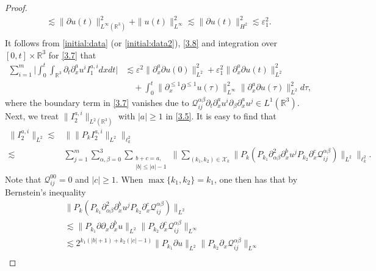 \documentclass[11pt,twoside]{article}
\def\cQ{\mathcal Q}
\def\p{\partial}
\def\ve{\varepsilon}
\def\ls{\lesssim}
\theoremstyle{plain}
\theoremstyle{definition}
\numberwithin{equation}{section}
\begin{document}
\begin{proof}
\begin{equation}
\begin{aligned}
			\ls
			\|\partial u(t)\|_{L^\infty(\mathbb{R}^3)}^2 +\|u(t)\|_{L^\infty}^2
			\ls
			\|\partial u(t)\|_{H^2}^2
			\ls \ve_1^2.\\
		\end{aligned}
	\end{equation}
	It follows from \eqref{initial:data} (or \eqref{initial:data2}), \eqref{3.8} and integration over $[0,t] \times \mathbb{R}^3$
for \eqref{3.7} that
	\begin{equation*}
		\begin{aligned}
		\sum_{i=1}^{m}\big| \int_0^t \int_{\mathbb{R}^3} \partial_t \partial_x^a u^i I_1^{a,i} dx dt\big|
        &\lesssim \ve^2\|\partial_x^a\partial  u(0)\|_{L^2}^2 + \ve^2_1\|\partial_x^a\partial  u(t)\|_{L^2}^2 \\
		&\quad + \int_0^t  \|\partial_x^{\le 1}\partial^{\le 1}  u(\tau)\|_{L^\infty}^2 \|\partial_x^a\partial  u(\tau)\|_{L^2}^2 d\tau,
		\end{aligned}	
	\end{equation*}
	where the boundary term in \eqref{3.7} vanishes due to $\cQ^{\alpha\beta}_{ij}\partial_t \partial_x^a u^i \partial_\beta \partial_x^a u^j  \in L^1(\mathbb{R}^3)$.\\
	Next, we treat $\|I_2^{a,i}\|_{L^2(\mathbb{R}^3)}$ with $|a| \geq 1$ in \eqref{3.5}.
It is easy to find that
	\begin{equation*}
		\begin{aligned}
			\|I_2^{a,i}\|_{L^2}
			\lesssim& \big\| \|P_k I_2^{a,i}\|_{L^2}\big\|_{\ell_k^2} \\
			\lesssim& \sum_{j=1}^m\sum_{\alpha,\beta=0}^3\sum_{\substack{b+c=a, \\ |b| \leq |a|-1}} \big\| \sum_{(k_1,k_2) \in \mathcal{X}_k} \| P_k(P_{k_1} \partial_{\alpha\beta}^2 \partial_x^b u^j P_{k_2} \p_x^c\cQ^{\alpha\beta}_{ij} )\|_{L^2} \big\|_{\ell_k^2}.
		\end{aligned}
	\end{equation*}
Note that $\mathcal{Q}^{00}_{ij}=0$ and $|c|\ge 1$. When $\max\{k_1, k_2\} = k_1$, one then has that by Bernstein's inequality
	\begin{equation*}
		\begin{aligned}
			&\|P_k(P_{k_1} \partial_{\alpha\beta}^2 \partial_x^b u^j P_{k_2} \p_x^c\cQ^{\alpha\beta}_{ij} )\|_{L^2}\\
			&\lesssim \|P_{k_1} \partial\partial_x \partial_x^b u\|_{L^2} \|P_{k_2} \p_x^c\cQ^{\alpha\beta}_{ij} \|_{L^\infty} \\
			&\lesssim 2^{k_1(|b|+1)+k_2(|c|-1)} \|P_{k_1} \partial u\|_{L^2} \|P_{k_2}\p_x \cQ^{\alpha\beta}_{ij}\|_{L^\infty}  \\

\end{aligned}
\end{equation*}
\end{proof}
\end{document}
